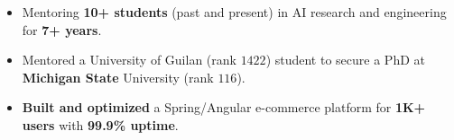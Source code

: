 \begin{itemize}
    \item Mentoring \textbf{10+ students} (past and present) in AI research and engineering for \textbf{7+ years}.
    \item Mentored a University of Guilan (rank $1422$) student to secure a PhD at \textbf{Michigan State} University (rank $116$).
\end{itemize}

\begin{itemize}
    \item \textbf{Built and optimized} a Spring/Angular e-commerce platform for \textbf{1K+ users} with \textbf{99.9\% uptime}.
\end{itemize}



    
		


